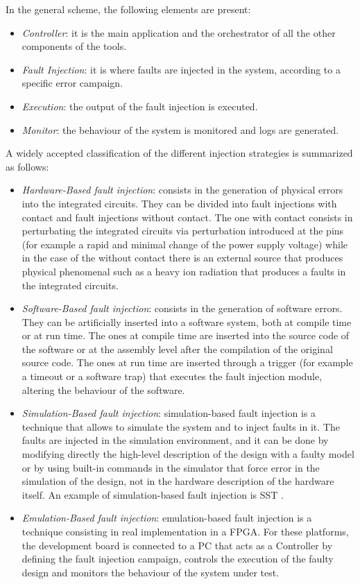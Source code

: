 In the general scheme, the following elements are present:

\begin{itemize}
    \item \textit{Controller}: it is the main application and the orchestrator of all the other components of the tools.
    \item \textit{Fault Injection}: it is where faults are injected in the system, according to a specific error campaign.
    \item \textit{Execution}: the output of the fault injection is executed.
    \item \textit{Monitor}: the behaviour of the system is monitored and logs are generated.
\end{itemize}

A widely accepted classification of the different injection strategies is summarized as follows:

\begin{itemize}
    \item \textit{Hardware-Based fault injection}: consists in the generation of physical errors into the integrated circuits. They can be divided into fault injections with contact and fault injections without contact. The one with contact consists in perturbating the integrated circuits via perturbation introduced at the pins (for example a rapid and minimal change of the power supply voltage) while in the case of the without contact there is an external source that produces physical phenomenal such as a heavy ion radiation that produces a faults in the integrated circuits.
    \item \textit{Software-Based fault injection}: consists in the generation of software errors. They can be artificially inserted into a software system, both at compile time or at run time. The ones at compile time \cite{fithesisdrizz} are inserted into the source code of the software or at the assembly level after the compilation of the original source code. The ones at run time are inserted through a trigger (for example a timeout or a software trap) that executes the fault injection module, altering the behaviour of the software.
    \item \textit{Simulation-Based fault injection}: simulation-based fault injection is a technique that allows to simulate the system and to inject faults in it. The faults are injected in the simulation environment, and it can be done by modifying directly the high-level description of the design with a faulty model or by using built-in commands in the simulator that force error in the simulation of the design, not in the hardware description of the hardware itself. An example of simulation-based fault injection is SST \cite{4375147}.
    \item \textit{Emulation-Based fault injection}: emulation-based fault injection is a technique consisting in real implementation in a FPGA. For these platforms, the development board is connected to a PC that acts as a Controller by defining the fault injection campaign, controls the execution of the faulty design and monitors the behaviour of the system under test.
\end{itemize}

